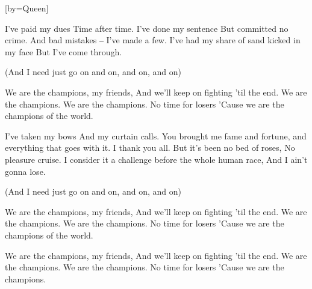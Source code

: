 

[by=Queen]



\chordsoff
\beginverse
I've paid my dues
Time after time.
I've done my sentence
But committed no crime.
And bad mistakes ‒
I've made a few.
I've had my share of sand kicked in my face
But I've come through.

(And I need just go on and on, and on, and on)
\endverse

\beginverse
We are the champions, my friends,
And we'll keep on fighting 'til the end.
We are the champions.
We are the champions.
No time for losers
'Cause we are the champions of the world.
\endverse

\beginverse

I've taken my bows
And my curtain calls.
You brought me fame and fortune, and everything that goes with it.
I thank you all.
But it's been no bed of roses,
No pleasure cruise.
I consider it a challenge before the whole human race,
And I ain't gonna lose.

(And I need just go on and on, and on, and on)
\endverse

\beginverse

We are the champions, my friends,
And we'll keep on fighting 'til the end.
We are the champions.
We are the champions.
No time for losers
'Cause we are the champions of the world.
\endverse

\beginverse

We are the champions, my friends,
And we'll keep on fighting 'til the end.
We are the champions.
We are the champions.
No time for losers
'Cause we are the champions.

\endverse


\endsong

